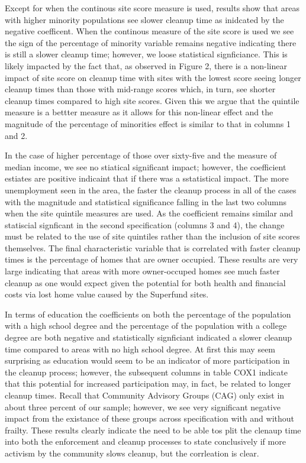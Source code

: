 \documentclass[12pt]{article}
\begin{document}
{Except for when the continous site score measure is used, results show that areas with higher minority populations see slower cleanup time as inidcated by the negative coefficent. When the continous measure of the site score is used we see the sign of the percentage of minority variable remains negative indicating there is still a slower cleanup time; however, we loose statistical signficiance. This is likely impacted by the fact that, as observed in Figure 2, there is a non-linear impact of site score on cleanup time with sites with the lowest score seeing longer cleanup times than those with mid-range scores which, in turn, see shorter cleanup times compared to high site scores. Given this we argue that the quintile measure is a bettter measure as it allows for this non-linear effect and the magnitude of the percentage of minorities effect is similar to that in columns 1 and 2.

In the case of higher percentage of those over sixty-five and the measure of median income, we see no stiatical significant impact; however, the coefficient estiates are positive indicaint that if there was a sstatistical impact. The more unemployment seen in the area, the faster the cleanup process in all of the cases with the magnitude and statistical significance falling in the last two columns when the site quintile measures are used. As the coefficient remains similar and statiscial signficant in the second specification (columns 3 and 4), the change must be related to the use of site quintiles rather than the inclusion of site scores themselves. The final characteristic variable that is correlated with faster cleanup times is the percentage of homes that are owner occupied. These results are very large indicating that areas with more owner-occuped homes see much faster cleanup as one would expect given the potential for both health and financial costs via lost home value caused by the Superfund sites. 

In terms of education the coefficients on both the percentage of the population with a high school degree and the percentage of the population with a college degree are both negative and statistically signficiant indicated a slower cleanup time compared to areas with no high school degree. At first this may seem surprising as education would seem to be an indicator of more participation in the cleanup process; however, the subsequent columns in table COX1 indicate that this potential for increased participation may, in fact, be related to longer cleanup times. Recall that Community Advisory Groups (CAG) only exist in about three percent of our sample; however, we see very significant negative impact from the existance of these groups across specification with and without frailty. These results clearly indicate the need to be able tos plit the clenaup time into both the enforcement and cleanup processes to state conclusively if more activism by the community slows cleanup, but the corrleation is clear. 

}
\end{document}
